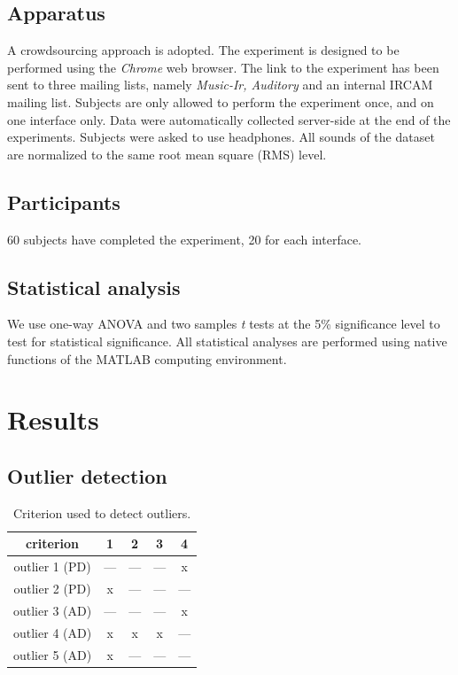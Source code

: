 \documentclass{aes2e}
\begin{document}
\subsection{Apparatus}

A crowdsourcing approach is adopted. The experiment is designed to be performed using the \textit{Chrome} web browser. The link to the experiment has been sent to three  mailing lists, namely \textit{Music-Ir, Auditory} and an internal IRCAM mailing list. Subjects are only allowed to perform the experiment once, and on one interface only. Data were automatically collected server-side at the end of the experiments. Subjects were asked to use headphones. All sounds of the dataset are normalized to the same root mean square (RMS) level.

\subsection{Participants}

60 subjects have completed the experiment, 20 for each interface.

\subsection{Statistical analysis}

We use one-way ANOVA and two samples \textit{t} tests at the 5\% significance level to test for statistical significance. All statistical analyses are performed using native functions of the MATLAB computing environment.


\section{Results} \label{results}

\subsection{Outlier detection}

\begin{table}[t]
\caption{\label{tab1} Criterion used to detect outliers.}
\begin{center}
\begin{tabular}{ccccc}
criterion      &  1  &  2  &  3  &  4  \\
\hline
outlier 1 (PD) & --- & --- & --- &  x  \\
outlier 2 (PD) &  x  & --- & --- & --- \\  
outlier 3 (AD) & --- & --- & --- &  x \\
outlier 4 (AD) &  x  &  x  &  x  & --- \\
outlier 5 (AD) &  x  & --- & --- & --- \\
\hline
\end{tabular}
\end{center}
\end{table} 
\end{document}
